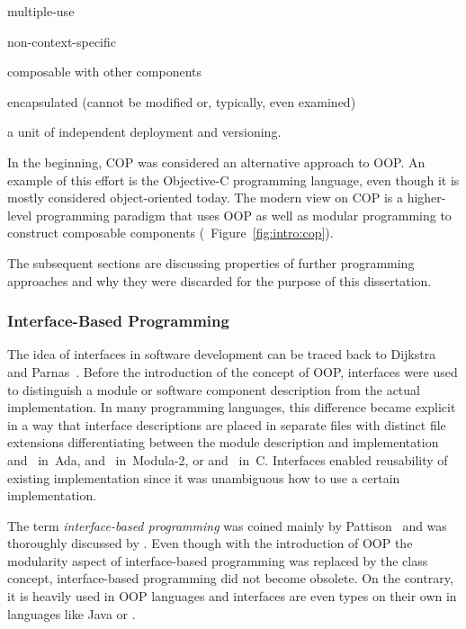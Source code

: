 \begin{itemize*}
	\item multiple-use
	\item non-context-specific
	\item composable with other components
	\item encapsulated (cannot be modified or, typically, even examined)
	\item a unit of independent deployment and versioning.
\end{itemize*}

In the beginning, \ac{COP} was considered an alternative approach to \ac{OOP}. An example of this effort is the Objective-C programming
language, even though it is mostly considered
object-oriented today. The modern view on \ac{COP} is a higher-level programming
paradigm that uses \ac{OOP} as well as modular programming to construct
composable components (\cf{}~Figure~\ref{fig:intro:cop}).


The subsequent sections are discussing properties of further programming approaches and why they were discarded for the purpose of this dissertation.

\subsubsection{Interface-Based Programming}%
\label{sec:rw:module:interface}

The idea of interfaces in software development can be traced back to Dijkstra~\cite{Dijkstra-1968THEMultiprogrammingSystem} and Parnas~\cite{Parnas-1972-SoftwareModuleSpecification}. Before the introduction of the concept of \ac{OOP}, interfaces were used to distinguish a module or software component description from the actual implementation. In many programming languages, this difference became explicit in a way that interface descriptions are placed in separate files with distinct file extensions differentiating between the module description and implementation \eg{}  and ~in~Ada,  and ~in~Modula-2, or  and ~in~C. Interfaces enabled reusability of existing implementation since it was unambiguous how to use a certain implementation.

The term \emph{interface-based programming} was coined mainly by Pattison~\cite{Pattison-2000-DistributedApplications} and was thoroughly discussed by \textcite{Steinmann-2005-Interface-BasedProgramming}. Even though with the introduction of \ac{OOP} the modularity aspect of interface-based programming was replaced by the class concept, interface-based programming did not become obsolete. On the contrary, it is heavily used in \ac{OOP} languages and interfaces are even types on their own in languages like Java or \Csh{}.

